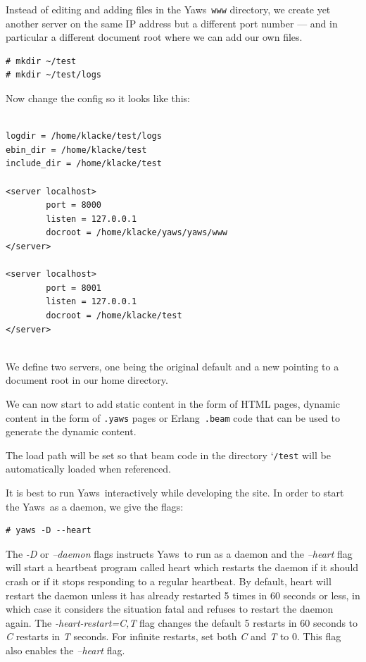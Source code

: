\documentclass[11pt,oneside,english]{book}
\newcommand{\Erlang}            %
        {{\sc Erlang}}
\newcommand{\Yaws}            %
        {{\sc Yaws}}
\begin{document}
Instead of editing and adding files in the \Yaws\ \verb+www+
directory, we create yet another server on the same IP address but a
different port number --- and in particular a different document root
where we can add our own files.

\begin{verbatim}
# mkdir ~/test
# mkdir ~/test/logs
\end{verbatim}

Now change the config so it looks like this:

\begin{verbatim}

logdir = /home/klacke/test/logs
ebin_dir = /home/klacke/test
include_dir = /home/klacke/test

<server localhost>
        port = 8000
        listen = 127.0.0.1
        docroot = /home/klacke/yaws/yaws/www
</server>

<server localhost>
        port = 8001
        listen = 127.0.0.1
        docroot = /home/klacke/test
</server>


\end{verbatim}

We define two servers, one being the original default
and a new pointing to a document root in our home directory.

We can now start to add static content in the form of HTML pages,
dynamic content in the form of \verb+.yaws+ pages or
\Erlang\ \verb+.beam+ code that can be used to generate the dynamic
content.

The load path will be set so that beam code in the directory
\char`\~\verb+/test+ will be automatically loaded when referenced.

It is best to run \Yaws\  interactively while developing the site.
In order to start the \Yaws\  as a daemon, we give the flags:
\begin{verbatim}
# yaws -D --heart
\end{verbatim}

The \textit{-D} or \textit{--daemon} flags instructs \Yaws\ to run as
a daemon and the \textit{--heart} flag will start a heartbeat program
called heart which restarts the daemon if it should crash or if it
stops responding to a regular heartbeat. By default, heart will
restart the daemon unless it has already restarted 5 times in 60
seconds or less, in which case it considers the situation fatal and
refuses to restart the daemon again. The \textit{-heart-restart=C,T}
flag changes the default 5 restarts in 60 seconds to \textit{C}
restarts in \textit{T} seconds. For infinite restarts, set both
\textit{C} and \textit{T} to 0. This flag also enables the
\textit{--heart} flag.
\end{document}
